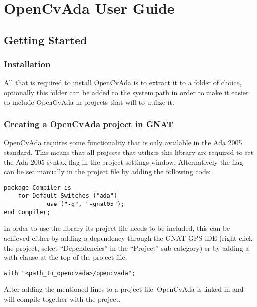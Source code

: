 \chapter{OpenCvAda User Guide}\label{sec:userguide}
\section{Getting Started}
\subsection{Installation}
All that is required to install OpenCvAda is to extract it to a folder of choice, optionally this folder can be added to the system path in order to make it easier to include OpenCvAda in projects that will to utilize it.
\subsection{Creating a OpenCvAda project in GNAT}
OpenCvAda requires some functionality that is only available in the Ada 2005 standard. This means that all projects that utilizes this library are required to set the Ada 2005 syntax flag in the project settings window. Alternatively the flag can be set manually in the project file by adding the following code:
\begin{lstlisting}
package Compiler is
	for Default_Switches ("ada") 
            use ("-g", "-gnat05");
end Compiler;
\end{lstlisting}
In order to use the library its project file needs to be included, this can be achieved either by adding a dependency through the GNAT GPS IDE (right-click the project, select ``Dependencies'' in the ``Project'' sub-category) or by adding a with clause at the top of the project file:
\begin{lstlisting}
with "<path_to_opencvada>/opencvada";
\end{lstlisting}
After adding the mentioned lines to a project file, OpenCvAda is linked in and will compile together with the project.
